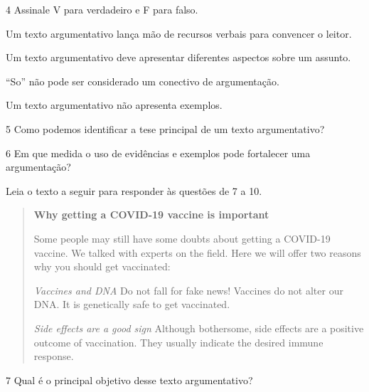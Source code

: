 \num{4} Assinale V para verdadeiro e F para falso.

\begin{boxlist}
 Um texto argumentativo lança mão de recursos verbais para convencer o leitor.

 Um texto argumentativo deve apresentar diferentes aspectos sobre um assunto.

 ``So'' não pode ser considerado um conectivo de argumentação.

 Um texto argumentativo não apresenta exemplos.
\end{boxlist}

\num{5} Como podemos identificar a tese principal de um texto argumentativo?


\num{6} Em que medida o uso de evidências e exemplos pode fortalecer uma argumentação?



Leia o texto a seguir para responder às questões de 7 a 10.

\begin{quote}
\textbf{Why getting a COVID-19 vaccine is important}

Some people may still have some doubts about getting a COVID-19 vaccine. We talked with experts on the field. Here we will offer two reasons why you should get vaccinated:

\textit{Vaccines and DNA}
Do not fall for fake news! Vaccines do not alter our DNA. It is genetically safe to get vaccinated.

\textit{Side effects are a good sign}
Although bothersome, side effects are a positive outcome of vaccination. They usually indicate the desired immune response.

\end{quote}

\num{7} Qual é o principal objetivo desse texto argumentativo?


